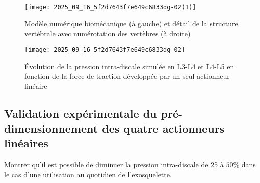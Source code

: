 
\ifprof
\else

\begin{figure}[!h]
\centering
\texttt{[image: 2025\_09\_16\_5f2d7643f7e649c6833dg-02(1)]}
\caption{\label{ccs_mp_2023_fig_02}  Modèle numérique biomécanique (à gauche) et détail de la structure vertébrale avec numérotation des vertèbres (à droite)}
\end{figure}

\fi


%



\ifprof
\else

\begin{figure}[!h]
\centering
\texttt{[image: 2025\_09\_16\_5f2d7643f7e649c6833dg-02]}
\caption{\label{ccs_mp_2023_fig_03}  Évolution de la pression intra-discale simulée en L3-L4 et L4-L5 en fonction de la force de traction développée par un seul actionneur linéaire}
\end{figure}

\fi


\subsection{Validation expérimentale du pré-dimensionnement des quatre actionneurs linéaires}
\begin{obj}
Montrer qu'il est possible de diminuer la pression intra-discale de 25 à $50 \%$ dans le cas d'une utilisation au quotidien de l'exosquelette.
\end{obj}
\ifprof
\else


